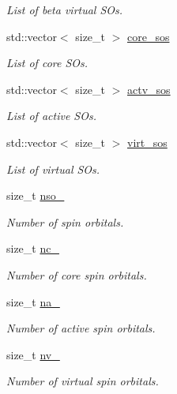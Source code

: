 \begin{DoxyCompactItemize}
\begin{DoxyCompactList}\small\item\em List of beta virtual S\+Os. \end{DoxyCompactList}\item 
std\+::vector$<$ size\+\_\+t $>$ \mbox{\hyperlink{classforte_1_1_m_r_d_s_r_g___s_o_a222529c9eccdb083b43f29be12672cec}{core\+\_\+sos}}
\begin{DoxyCompactList}\small\item\em List of core S\+Os. \end{DoxyCompactList}\item 
std\+::vector$<$ size\+\_\+t $>$ \mbox{\hyperlink{classforte_1_1_m_r_d_s_r_g___s_o_a5f918fac26849020094ef12e7f6df562}{actv\+\_\+sos}}
\begin{DoxyCompactList}\small\item\em List of active S\+Os. \end{DoxyCompactList}\item 
std\+::vector$<$ size\+\_\+t $>$ \mbox{\hyperlink{classforte_1_1_m_r_d_s_r_g___s_o_a1788c04a6db550d8a2f629b3a10c7b10}{virt\+\_\+sos}}
\begin{DoxyCompactList}\small\item\em List of virtual S\+Os. \end{DoxyCompactList}\item 
size\+\_\+t \mbox{\hyperlink{classforte_1_1_m_r_d_s_r_g___s_o_a631b2af6befeb374c6c5568aa8992a96}{nso\+\_\+}}
\begin{DoxyCompactList}\small\item\em Number of spin orbitals. \end{DoxyCompactList}\item 
size\+\_\+t \mbox{\hyperlink{classforte_1_1_m_r_d_s_r_g___s_o_ada88283346d5ac8c6454edc28c097582}{nc\+\_\+}}
\begin{DoxyCompactList}\small\item\em Number of core spin orbitals. \end{DoxyCompactList}\item 
size\+\_\+t \mbox{\hyperlink{classforte_1_1_m_r_d_s_r_g___s_o_af8a3b84262e15c0445f8cfa846be8e37}{na\+\_\+}}
\begin{DoxyCompactList}\small\item\em Number of active spin orbitals. \end{DoxyCompactList}\item 
size\+\_\+t \mbox{\hyperlink{classforte_1_1_m_r_d_s_r_g___s_o_afe122bdd88d3a3d864015d90b1e6e78b}{nv\+\_\+}}
\begin{DoxyCompactList}\small\item\em Number of virtual spin orbitals. \end{DoxyCompactList}\item 

\end{DoxyCompactItemize}

